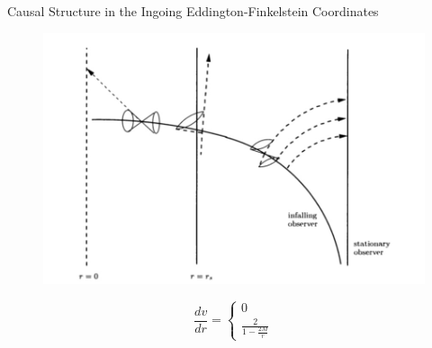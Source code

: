\documentclass{beamer}
\begin{document}
		
        \begin{frame}{Causal Structure in the Ingoing Eddington-Finkelstein Coordinates}
        	\begin{center}
				\begin{figure}
				\includegraphics[scale=0.25] {fig2a.jpg}
				\end{figure}
                \tiny{
                $$ \frac{dv}{dr} = \left\lbrace 
            		\begin{array}{c} 0\\
						\frac{2}{1 - \frac{2M}{r}}
					\end{array} \right. $$}
			\end{center}
        \end{frame}
  
\end{document}
